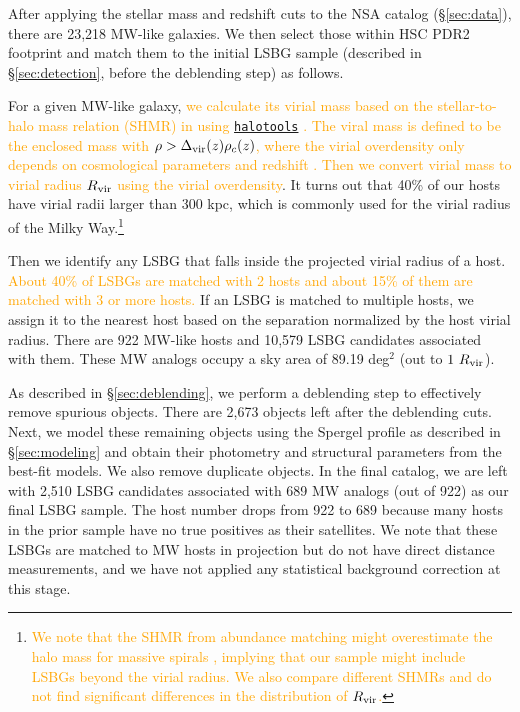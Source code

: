 \documentclass[twocolumn,astrosymb,twocolappendix,linenumbers]{aastex631}
\newcommand{\emphasize}{\textcolor{orange}}
\newcommand{\code}[1]{\texttt{#1}}
\begin{document}
\begin{CJK*}{UTF8}{gbsn}
After applying the stellar mass and redshift cuts to the NSA catalog (\S\ref{sec:data}), there are 23,218 MW-like galaxies. We then select those within HSC PDR2 footprint and match them to the initial LSBG sample (described in \S \ref{sec:detection}, before the deblending step) as follows. 

For a given MW-like galaxy, \emphasize{we calculate its virial mass based on the stellar-to-halo mass relation (SHMR) in \citet{Behroozi2010} using \href{https://halotools.readthedocs.io/en/latest/index.html}{\code{halotools}} \citep{Hearin2017}. The viral mass is defined to be the enclosed mass with $\rho > \Delta_{\rm vir}(z) \rho_c(z)$, where the virial overdensity only depends on cosmological parameters and redshift \citep{Bryan1998}. Then we convert virial mass to virial radius $R_{\rm vir}$ using the virial overdensity}. It turns out that 40\% of our hosts have virial radii larger than 300 kpc, which is commonly used for the virial radius of the Milky Way.\footnote{\emphasize{We note that the SHMR from abundance matching might overestimate the halo mass for massive spirals \citep[e.g.,][]{Posti2019,Mancera2022b}, implying that our sample might include LSBGs beyond the virial radius. We also compare different SHMRs \citep[e.g.,][]{Moster2013} and do not find significant differences in the distribution of $R_{\rm vir}$.}} 

Then we identify any LSBG that falls inside the projected virial radius of a host. \emphasize{About 40\% of LSBGs are matched with 2 hosts and about 15\% of them are matched with 3 or more hosts.} If an LSBG is matched to multiple hosts, we assign it to the nearest host based on the separation normalized by the host virial radius. There are 922 MW-like hosts and 10,579 LSBG candidates associated with them. These MW analogs occupy a sky area of 89.19 deg$^{2}$ (out to $1\ R_{\rm vir}$).

As described in \S\ref{sec:deblending}, we perform a deblending step to effectively remove spurious objects. There are 2,673 objects left after the deblending cuts. Next, we model these remaining objects using the Spergel profile as described in \S\ref{sec:modeling} and obtain their photometry and structural parameters from the best-fit models. We also remove duplicate objects. In the final catalog, we are left with 2,510 LSBG candidates associated with 689 MW analogs (out of 922) as our final LSBG sample. The host number drops from 922 to 689 because many hosts in the prior sample have no true positives as their satellites. We note that these LSBGs are matched to MW hosts in projection but do not have direct distance measurements, and we have not applied any statistical background correction at this stage. 


\end{CJK*}
\end{document}
